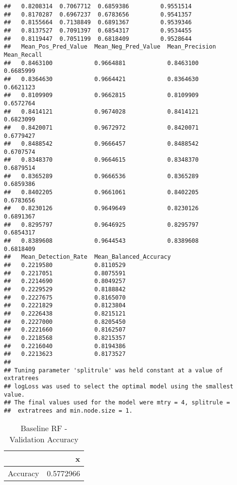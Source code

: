 \documentclass[]{article}
\begin{document}
\begin{verbatim}
##   0.8208314  0.7067712  0.6859386         0.9551514       
##   0.8170287  0.6967237  0.6783656         0.9541357       
##   0.8155664  0.7138849  0.6891367         0.9539346       
##   0.8137527  0.7091397  0.6854317         0.9534455       
##   0.8119447  0.7051199  0.6818409         0.9528644       
##   Mean_Pos_Pred_Value  Mean_Neg_Pred_Value  Mean_Precision  Mean_Recall
##   0.8463100            0.9664881            0.8463100       0.6685999  
##   0.8364630            0.9664421            0.8364630       0.6621123  
##   0.8109909            0.9662815            0.8109909       0.6572764  
##   0.8414121            0.9674028            0.8414121       0.6823099  
##   0.8420071            0.9672972            0.8420071       0.6779427  
##   0.8488542            0.9666457            0.8488542       0.6707574  
##   0.8348370            0.9664615            0.8348370       0.6879514  
##   0.8365289            0.9666536            0.8365289       0.6859386  
##   0.8402205            0.9661061            0.8402205       0.6783656  
##   0.8230126            0.9649649            0.8230126       0.6891367  
##   0.8295797            0.9646925            0.8295797       0.6854317  
##   0.8389608            0.9644543            0.8389608       0.6818409  
##   Mean_Detection_Rate  Mean_Balanced_Accuracy
##   0.2219580            0.8110529             
##   0.2217051            0.8075591             
##   0.2214690            0.8049257             
##   0.2229529            0.8188842             
##   0.2227675            0.8165070             
##   0.2221829            0.8123804             
##   0.2226438            0.8215121             
##   0.2227000            0.8205450             
##   0.2221660            0.8162507             
##   0.2218568            0.8215357             
##   0.2216040            0.8194386             
##   0.2213623            0.8173527             
## 
## Tuning parameter 'splitrule' was held constant at a value of extratrees
## logLoss was used to select the optimal model using the smallest value.
## The final values used for the model were mtry = 4, splitrule =
##  extratrees and min.node.size = 1.
\end{verbatim}

\begin{table}[!h]

\caption{\label{tab:baseline-rf-results}Baseline RF - Validation Accuracy}
\centering
\begin{tabular}[t]{lr}
\toprule
  & x\\
\midrule
Accuracy & 0.5772966\\
\bottomrule
\end{tabular}
\end{table}
\end{document}
